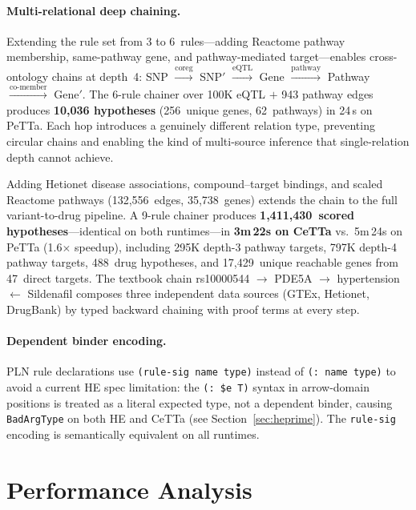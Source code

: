 \documentclass[11pt]{article}
\newcommand{\code}[1]{\texttt{#1}}
\newcommand{\PeTTa}{\textup{PeTTa}}
\newcommand{\CeTTa}{\textup{CeTTa}}
\begin{document}
\paragraph{Multi-relational deep chaining.}
Extending the rule set from 3 to 6~rules---adding Reactome pathway
membership, same-pathway gene, and pathway-mediated target---enables
cross-ontology chains at depth~4:
SNP $\xrightarrow{\text{coreg}}$ SNP$'$
$\xrightarrow{\text{eQTL}}$ Gene
$\xrightarrow{\text{pathway}}$ Pathway
$\xrightarrow{\text{co-member}}$ Gene$'$.
The 6-rule chainer over 100K eQTL $+$ 943 pathway edges produces
\textbf{10{,}036 hypotheses} (256~unique genes, 62~pathways)
in 24\,s on \PeTTa{}.  Each hop introduces a genuinely different
relation type, preventing circular chains and enabling the kind of
multi-source inference that single-relation depth cannot achieve.

Adding Hetionet disease associations, compound--target bindings,
and scaled Reactome pathways (132{,}556~edges, 35{,}738~genes)
extends the chain to the full variant-to-drug pipeline.  A 9-rule
chainer produces \textbf{1{,}411{,}430~scored hypotheses}---identical
on both runtimes---in \textbf{3m\,22s on \CeTTa{}} vs.\ 5m\,24s on
\PeTTa{} (1.6$\times$ speedup), including 295K depth-3 pathway targets,
797K depth-4 pathway targets, 488~drug hypotheses, and 17{,}429~unique
reachable genes from 47~direct targets.  The textbook chain
rs10000544 $\to$ PDE5A $\to$ hypertension $\leftarrow$ Sildenafil
composes three independent data sources (GTEx, Hetionet, DrugBank) by
typed backward chaining with proof terms at every step.

\paragraph{Dependent binder encoding.}
PLN rule declarations use \code{(rule-sig name type)} instead of
\code{(: name type)} to avoid a current HE spec limitation: the
\code{(: \$e T)} syntax in arrow-domain positions is treated as a
literal expected type, not a dependent binder, causing \code{BadArgType}
on both HE and \CeTTa{} (see Section~\ref{sec:heprime}).
The \code{rule-sig} encoding is semantically equivalent on all runtimes.

\section{Performance Analysis}
\end{document}
